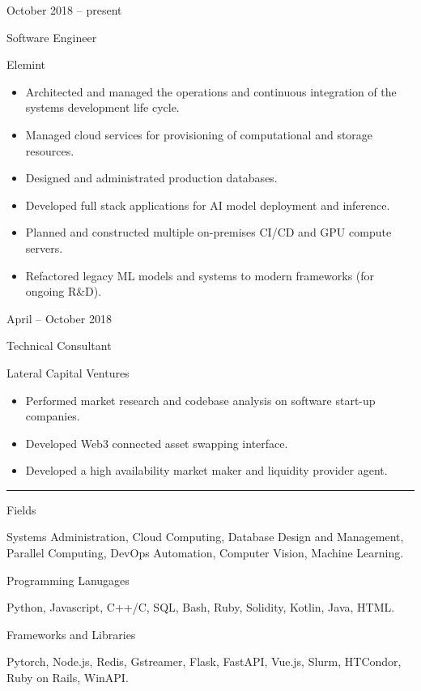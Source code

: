 \documentclass[a4paper,10pt]{article}
\newlength{\cvcolumngapwidth}
\newlength{\cvleftcolumnwidth}
\newlength{\cvrightcolumnwidth}
\newcommand{\cvsectionstyle}[1]{{\normalsize\cvsectionfont\textcolor{cvsectioncolor}{#1}}}
\newcommand{\cvtitlestyle}[1]{{\large\cvtitlefont\textcolor{cvtitlecolor}{#1}}}
\newcommand{\cvdurationstyle}[1]{{\small\cvdurationfont\textcolor{cvdurationcolor}{#1}}}
\newcommand{\cvheadingstyle}[1]{{\normalsize\cvheadingfont\textcolor{cvheadingcolor}{#1}}}
\newlength{\cvafteritemskipamount}
\newlength{\cvaftersectionskipamount}
\newlength{\cvbetweensectionandheadingextraskipamount}
\newlength{\cvaftertitleskipamount}
\newlength{\cvparskip}
\newcommand{\cvsection}[1]{
    \begin{minipage}[t]{\cvleftcolumnwidth}
        \raggedleft\cvsectionstyle{#1}
    \end{minipage}%
    \hspace{\cvcolumngapwidth}%
    \begin{minipage}[t]{\cvrightcolumnwidth}
        \textcolor{cvrulecolor}{\rule{\cvrightcolumnwidth}{0.3mm}}
    \end{minipage}

    \vspace{\cvaftersectionskipamount}
}
\newcommand{\cvitem}[2]{
    \begin{minipage}[t]{\cvleftcolumnwidth}
        \raggedleft #1
    \end{minipage}%
    \hspace{\cvcolumngapwidth}%
    \begin{minipage}[t]{\cvrightcolumnwidth}
        \setlength{\parskip}{\cvparskip} #2
    \end{minipage}

    \vspace{\cvafteritemskipamount}
}
\newcommand{\cvtitle}[1]{
    \cvtitlestyle{#1}

    \vspace{\cvaftertitleskipamount}
    \vspace{-\cvparskip}
}
\begin{document}
\cvitem{
    \cvdurationstyle{October 2018 -- present}
}{
    \cvtitle{Software Engineer}

    Elemint

    \begin{itemize}[leftmargin=*]
        \item Architected and managed the operations and continuous integration of the systems development life cycle.
        \item Managed cloud services for provisioning of computational and storage resources.
        \item Designed and administrated production databases.
        \item Developed full stack applications for AI model deployment and inference.
        \item Planned and constructed multiple on-premises CI/CD and GPU compute servers.
        \item Refactored legacy ML models and systems to modern frameworks (for ongoing R\&D).
    \end{itemize}
}

\cvitem{
    \cvdurationstyle{April -- October 2018}
}{
    \cvtitle{Technical Consultant}

    Lateral Capital Ventures

    \begin{itemize}[leftmargin=*]
        \item Performed market research and codebase analysis on software start-up companies.
        \item Developed Web3 connected asset swapping interface.
        \item Developed a high availability market maker and liquidity provider agent.
    \end{itemize}
}


\cvsection{SKILLS}

\vspace{\cvbetweensectionandheadingextraskipamount}

\cvitem{
    \cvheadingstyle{Fields}
}{
    Systems Administration, Cloud Computing, Database Design and Management, Parallel Computing, DevOps Automation, Computer Vision, Machine Learning.
}

\cvitem{
    \cvheadingstyle{Programming Lanugages}
}{
    Python, Javascript, C++/C, SQL, Bash, Ruby, Solidity, Kotlin, Java, HTML.
}

\cvitem{
    \cvheadingstyle{Frameworks and Libraries}
}{
    Pytorch, Node.js, Redis, Gstreamer, Flask, FastAPI, Vue.js, Slurm, HTCondor, Ruby on Rails, WinAPI.
}
\end{document}
